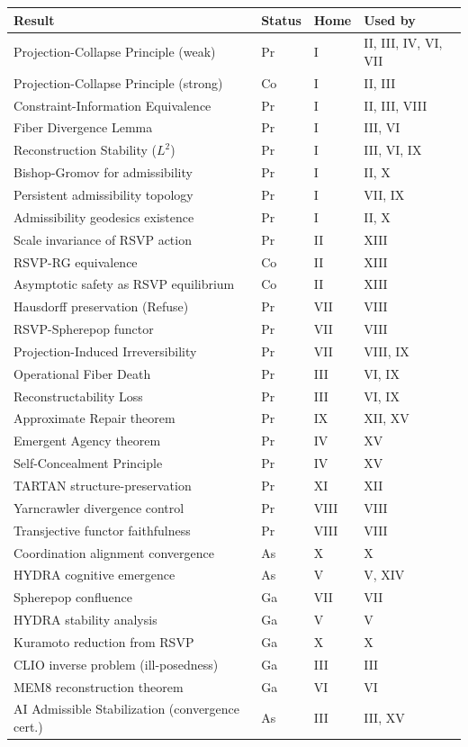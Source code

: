 \documentclass[11pt, a4paper]{article}
\begin{document}
\medskip
\begin{longtable}{p{5cm}lp{1.5cm}p{3.5cm}}
\toprule
\textbf{Result} & \textbf{Status} & \textbf{Home} & \textbf{Used by} \\
\midrule
Projection-Collapse Principle (weak) & Pr & I & II, III, IV, VI, VII \\
Projection-Collapse Principle (strong) & Co & I & II, III \\
Constraint-Information Equivalence & Pr & I & II, III, VIII \\
Fiber Divergence Lemma & Pr & I & III, VI \\
Reconstruction Stability ($L^2$) & Pr & I & III, VI, IX \\
Bishop-Gromov for admissibility & Pr & I & II, X \\
Persistent admissibility topology & Pr & I & VII, IX \\
Admissibility geodesics existence & Pr & I & II, X \\
Scale invariance of RSVP action & Pr & II & XIII \\
RSVP-RG equivalence & Co & II & XIII \\
Asymptotic safety as RSVP equilibrium & Co & II & XIII \\
Hausdorff preservation (Refuse) & Pr & VII & VIII \\
RSVP-Spherepop functor & Pr & VII & VIII \\
Projection-Induced Irreversibility & Pr & VII & VIII, IX \\
Operational Fiber Death & Pr & III & VI, IX \\
Reconstructability Loss & Pr & III & VI, IX \\
Approximate Repair theorem & Pr & IX & XII, XV \\
Emergent Agency theorem & Pr & IV & XV \\
Self-Concealment Principle & Pr & IV & XV \\
TARTAN structure-preservation & Pr & XI & XII \\
Yarncrawler divergence control & Pr & VIII & VIII \\
Transjective functor faithfulness & Pr & VIII & VIII \\
Coordination alignment convergence & As & X & X \\
HYDRA cognitive emergence & As & V & V, XIV \\
Spherepop confluence & Ga & VII & VII \\
HYDRA stability analysis & Ga & V & V \\
Kuramoto reduction from RSVP & Ga & X & X \\
CLIO inverse problem (ill-posedness) & Ga & III & III \\
MEM\textbar{}8 reconstruction theorem & Ga & VI & VI \\
AI Admissible Stabilization (convergence cert.) & As & III & III, XV \\
\bottomrule
\end{longtable}
\end{document}
